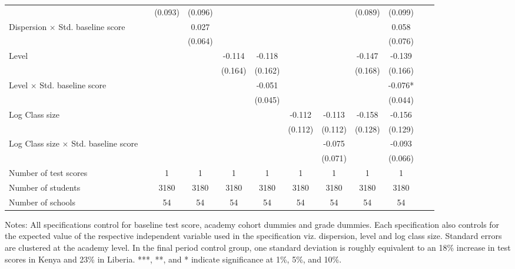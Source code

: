 \begin{center}
\begin{scriptsize}
\begin{threeparttable}
\begin{tabular} {@{} l l c c c c c c c c c c  @{}}
                 &  & (0.093) & (0.096) &  &  &  &  & (0.089) & (0.099) \\
Dispersion $\times$ Std. baseline score &  &  & 0.027 &  &  &  &  &  & 0.058 \\
                 &  &  & (0.064) &  &  &  &  &  & (0.076) \\
Level &  &  &  & -0.114 & -0.118 &  &  & -0.147 & -0.139 \\
                 &  &  &  & (0.164) & (0.162) &  &  & (0.168) & (0.166) \\
Level $\times$ Std. baseline score &  &  &  &  & -0.051 &  &  &  & -0.076* \\
                 &  &  &  &  & (0.045) &  &  &  & (0.044) \\
Log Class size &  &  &  &  &  & -0.112 & -0.113 & -0.158 & -0.156 \\
                 &  &  &  &  &  & (0.112) & (0.112) & (0.128) & (0.129) \\
Log Class size $\times$ Std. baseline score &  &  &  &  &  &  & -0.075 &  & -0.093 \\
                 &  &  &  &  &  &  & (0.071) &  & (0.066) \\
\midrule
Number of test scores &  & 1 & 1 & 1 & 1 & 1 & 1 & 1 & 1 \\
Number of students &  & 3180 & 3180 & 3180 & 3180 & 3180 & 3180 & 3180 & 3180 \\
Number of schools &  & 54 & 54 & 54 & 54 & 54 & 54 & 54 & 54 \\
\bottomrule
\end{tabular}
\begin{tablenotes}
\item Notes: All specifications control for baseline test score, academy cohort dummies and grade dummies. Each specification also controls for the expected value of the respective independent variable used in the specification viz. dispersion, level and log class size. Standard errors are clustered at the academy level. In the final period control group, one standard deviation is roughly equivalent to an 18\% increase in test scores in Kenya and 23\% in Liberia. ***, **, and * indicate significance at 1\%, 5\%, and 10\%.\end{tablenotes}
\end{threeparttable}
\end{scriptsize}
\end{center}
\clearpage

